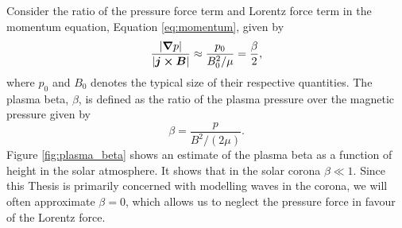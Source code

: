 


Consider the ratio of the pressure force term and Lorentz force term in the momentum equation, Equation \eqref{eq:momentum}, given by
\[\frac{|\grad p|}{|\boldsymbol{j}\cross\boldsymbol{B}|}\approx \frac{p_0}{B_0^2/\mu}=\frac{\beta}{2},\]
where $p_0$ and $B_0$ denotes the typical size of their respective quantities. The plasma beta, $\beta$, is defined as the ratio of the plasma pressure over the magnetic pressure given by
\begin{equation}
    \label{eq:plasma_beta}
    \beta = \frac{p}{B^2/(2\mu)}.
\end{equation}
Figure \ref{fig:plasma_beta} shows an estimate of the plasma beta as a function of height in the solar atmosphere. It shows that in the solar corona $\beta \ll 1$. Since this Thesis is primarily concerned with modelling waves in the corona, we will often approximate $\beta=0$, which allows us to neglect the pressure force in favour of the Lorentz force.

